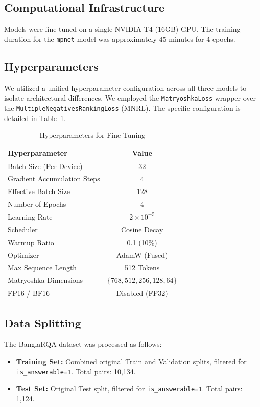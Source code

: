 \documentclass[manuscript,screen,review]{acmart}
\begin{document}
\subsection{Computational Infrastructure}
Models were fine-tuned on a single NVIDIA T4 (16GB) GPU. The training duration for the \texttt{mpnet} model was approximately 45 minutes for 4 epochs.

\subsection{Hyperparameters}
We utilized a unified hyperparameter configuration across all three models to isolate architectural differences. We employed the \texttt{MatryoshkaLoss} wrapper over the \texttt{MultipleNegativesRankingLoss} (MNRL). The specific configuration is detailed in Table~\ref{tab:hyperparameters}.

\begin{table}[htbp]
    \caption{Hyperparameters for Fine-Tuning}
    \label{tab:hyperparameters}
    \centering
    \begin{tabular}{lc}
        \toprule
        \textbf{Hyperparameter} & \textbf{Value} \\
        \midrule
        Batch Size (Per Device) & 32 \\
        Gradient Accumulation Steps & 4 \\
        Effective Batch Size & 128 \\
        Number of Epochs & 4 \\
        Learning Rate & $2 \times 10^{-5}$ \\
        Scheduler & Cosine Decay \\
        Warmup Ratio & 0.1 (10\%) \\
        Optimizer & AdamW (Fused) \\
        Max Sequence Length & 512 Tokens \\
        Matryoshka Dimensions & $\{768, 512, 256, 128, 64\}$ \\
        FP16 / BF16 & Disabled (FP32) \\
        \bottomrule
    \end{tabular}
\end{table}

\subsection{Data Splitting}
The BanglaRQA dataset was processed as follows:
\begin{itemize}
    \item \textbf{Training Set:} Combined original Train and Validation splits, filtered for \texttt{is\_answerable=1}. Total pairs: 10,134.
    \item \textbf{Test Set:} Original Test split, filtered for \texttt{is\_answerable=1}. Total pairs: 1,124.
\end{itemize}
\end{document}
